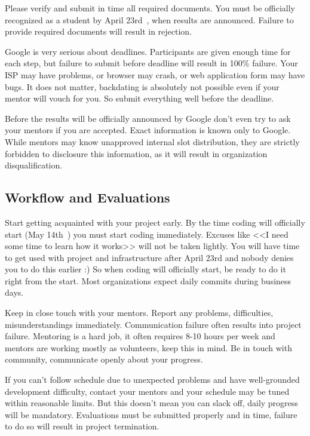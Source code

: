 \documentclass[10pt, a5paper]{article}
\begin{document}
Please verify and submit in time all required \linebreak documents. You must be officially recognized as a student by April 23rd~\cite{Savchenko-3}, when results are announced. Failure to provide required \linebreak documents will result in rejection.

Google is very serious about deadlines. Participants are given enough time for each step, but failure to submit before deadline will result in 100\% failure. Your ISP may have problems, or browser may crash, or web application form may have bugs. It does not matter, backdating is absolutely not possible even if your mentor will vouch for you. So submit everything well before the deadline.

Before the results will be officially announced by Google don't even try to ask your mentors if you are accepted. Exact information is known only to Google. While mentors may know unapproved internal slot distribution, they are strictly forbidden to disclosure this information, as it will result in organization disqualification.

\subsection*{Workflow and Evaluations}

Start getting acquainted with your project early. By the time coding will officially start (May 14th~\cite{Savchenko-3}) you must start coding immediately. Excuses like <<I need some time to learn how it works>> will not be taken lightly. You will have time to get used with project and infrastructure after April 23rd and nobody denies you to do this earlier :) So when coding will officially start, be ready to do it right from the start. Most organizations expect daily commits during business days.

Keep in close touch with your mentors. Report any problems, \linebreak difficulties, misunderstandings immediately. Communication failure \linebreak often results into project failure. Mentoring is a hard job, it often requires 8-10 hours per week and mentors are working mostly \linebreak as volunteers, keep this in mind. Be in touch with community, \linebreak communicate openly about your progress.

If you can't follow schedule due to unexpected problems and have well-grounded development difficulty, contact your mentors and your schedule may be tuned within reasonable limits. But this doesn't mean you can slack off, daily progress will be mandatory. Evaluations must be submitted properly and in time, failure to do so will result in project termination.
\end{document}
